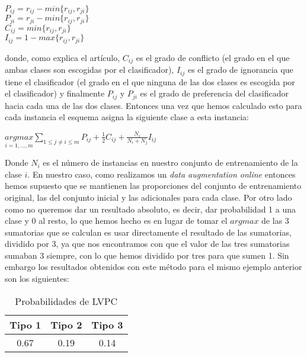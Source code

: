 \begin{center}
$P_{ij} = r_{ij} - min\lbrace r_{ij}, r_{ji} \rbrace$\\
$P_{ji} = r_{ji} - min \lbrace r_{ij}, r_{ji} \rbrace$\\
$C_{ij} = min\lbrace r_{ij}, r_{ji} \rbrace$\\
$I_{ij} = 1 - max\lbrace r_{ij}, r_{ji} \rbrace$
\end{center}

donde, como explica el artículo, $C_{ij}$ es el grado de conflicto (el grado en el que ambas clases son escogidas por el clasificador), $I_{ij}$ es el grado de ignorancia que tiene el clasificador (el grado en el que ninguna de las dos clases es escogida por el clasificador) y finalmente $P_{ij}$ y $P_{ji}$ es el grado de preferencia del clasificador hacia cada una de las dos clases. Entonces una vez que hemos calculado esto para cada instancia el esquema asigna la siguiente clase a esta instancia:

\begin{center}
$\underset{i = 1,...,m}{argmax} \underset{1 \leq j \neq i \leq m}{\sum} P_{ij} + \frac{1}{2} C_{ij} + \frac{N_i}{N_i + N_j}I_{ij}$
\end{center}

Donde $N_i$ es el número de instancias en nuestro conjunto de entrenamiento de la clase $i$. En nuestro caso, como realizamos un \textit{data augmentation online} entonces hemos supuesto que se mantienen las proporciones del conjunto de entrenamiento original, las del conjunto inicial y las adicionales para cada clase. Por otro lado como no queremos dar un resultado absoluto, es decir, dar probabilidad 1 a una clase y 0 al resto, lo que hemos hecho es en lugar de tomar el $argmax$ de las 3 sumatorias que se calculan es usar directamente el resultado de las sumatorias, dividido por 3, ya que nos encontramos con que el valor de las tres sumatorias sumaban 3 siempre, con lo que hemos dividido por tres para que sumen 1. Sin embargo los resultados obtenidos con este método para el mismo ejemplo anterior son los siguientes:

\begin{table}[H]
\centering
\caption{Probabilidades de LVPC}
\begin{tabular}{|c|c|c|}
\hline
Tipo 1 & Tipo 2 & Tipo 3 \\ \hline
0.67   & 0.19   & 0.14   \\ \hline
\end{tabular}
\end{table}

